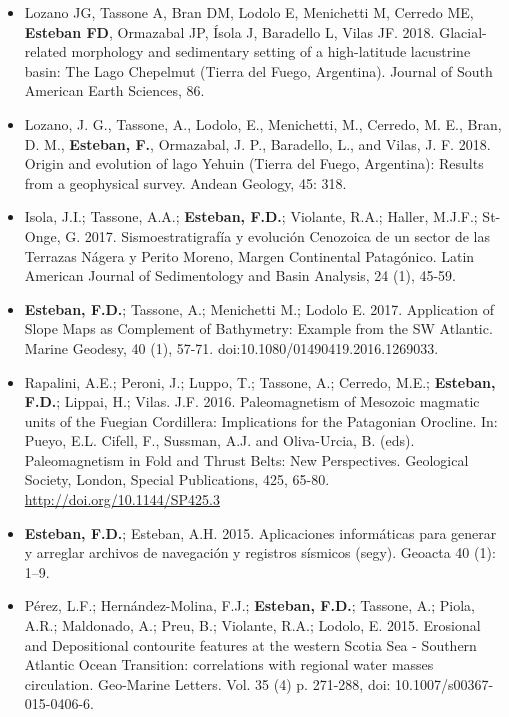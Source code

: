\documentclass[11pt, a4paper]{article}
\begin{document}
\begin{itemize}
  \item Lozano JG, Tassone A, Bran DM, Lodolo E, Menichetti M, Cerredo ME, \textbf{Esteban FD}, Ormazabal JP, Ísola J, Baradello L, Vilas JF. 2018. Glacial-related morphology and sedimentary setting of a high-latitude lacustrine basin: The Lago Chepelmut (Tierra del Fuego, Argentina). Journal of South American Earth Sciences, 86.

  \item Lozano, J. G., Tassone, A., Lodolo, E., Menichetti, M., Cerredo, M. E., Bran, D. M., \textbf{Esteban, F.}, Ormazabal, J. P., Baradello, L., and Vilas, J. F. 2018. Origin and evolution of lago Yehuin (Tierra del Fuego, Argentina): Results from a geophysical survey. Andean Geology, 45: 318.

  \item Isola, J.I.; Tassone, A.A.; \textbf{Esteban, F.D.}; Violante, R.A.; Haller, M.J.F.; St-Onge, G. 2017. Sismoestratigrafía y evolución Cenozoica de un sector de las Terrazas Nágera y Perito Moreno, Margen Continental Patagónico. Latin American Journal of Sedimentology and Basin Analysis, 24 (1), 45-59.

  \item \textbf{Esteban, F.D.}; Tassone, A.; Menichetti M.; Lodolo E. 2017. Application of Slope Maps as Complement of Bathymetry: Example from the SW Atlantic. Marine Geodesy, 40 (1), 57-71. doi:10.1080/01490419.2016.1269033.

  \item Rapalini, A.E.; Peroni, J.; Luppo, T.; Tassone, A.; Cerredo, M.E.; \textbf{Esteban, F.D.}; Lippai, H.; Vilas. J.F. 2016. Paleomagnetism of Mesozoic magmatic units of the Fuegian Cordillera: Implications for the Patagonian Orocline. In: Pueyo, E.L. Cifell, F., Sussman, A.J. and Oliva-Urcia, B. (eds). Paleomagnetism in Fold and Thrust Belts: New Perspectives. Geological Society, London, Special Publications, 425, 65-80. \url{http://doi.org/10.1144/SP425.3}

  \item \textbf{Esteban, F.D.}; Esteban, A.H. 2015. Aplicaciones informáticas para generar y arreglar archivos de navegación y registros sísmicos (segy). Geoacta 40 (1): 1–9.

  \item Pérez, L.F.; Hernández-Molina, F.J.; \textbf{Esteban, F.D.}; Tassone, A.; Piola, A.R.; Maldonado, A.; Preu, B.; Violante, R.A.; Lodolo, E. 2015. Erosional and Depositional contourite features at the western Scotia Sea - Southern Atlantic Ocean Transition: correlations with regional water masses circulation. Geo-Marine Letters. Vol. 35 (4) p. 271-288, doi: 10.1007/s00367-015-0406-6.


\end{itemize}
\end{document}
